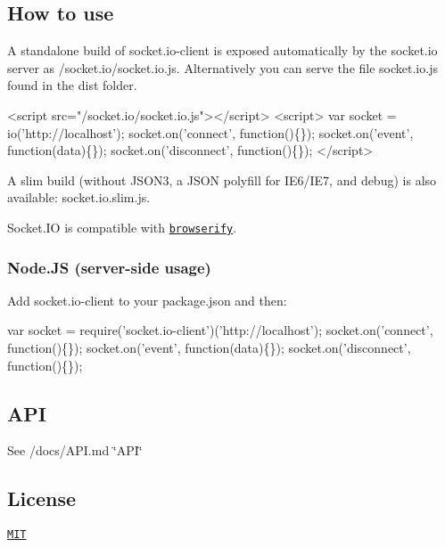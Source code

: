 \href{http://travis-ci.org/socketio/socket.io-client}{\tt } \href{https://david-dm.org/socketio/socket.io-client}{\tt } \href{https://david-dm.org/socketio/socket.io-client#info=devDependencies}{\tt }   \href{http://slack.socket.io}{\tt }

\href{https://saucelabs.com/u/socket}{\tt }

\subsection*{How to use}

A standalone build of {\ttfamily socket.\+io-\/client} is exposed automatically by the socket.\+io server as {\ttfamily /socket.io/socket.\+io.\+js}. Alternatively you can serve the file {\ttfamily socket.\+io.\+js} found in the {\ttfamily dist} folder.


\begin{DoxyCode}
<script src="/socket.io/socket.io.js"></script>
<script>
  var socket = io('http://localhost');
  socket.on('connect', function()\{\});
  socket.on('event', function(data)\{\});
  socket.on('disconnect', function()\{\});
</script>
\end{DoxyCode}


A slim build (without {\ttfamily J\+S\+O\+N3}, a J\+S\+ON polyfill for I\+E6/\+I\+E7, and {\ttfamily debug}) is also available\+: {\ttfamily socket.\+io.\+slim.\+js}.

Socket.\+IO is compatible with \href{http://browserify.org/}{\tt browserify}.

\subsubsection*{Node.\+JS (server-\/side usage)}

Add {\ttfamily socket.\+io-\/client} to your {\ttfamily package.\+json} and then\+:


\begin{DoxyCode}
var socket = require('socket.io-client')('http://localhost');
socket.on('connect', function()\{\});
socket.on('event', function(data)\{\});
socket.on('disconnect', function()\{\});
\end{DoxyCode}


\subsection*{A\+PI}

See /docs/\+A\+PI.md \char`\"{}\+A\+P\+I\char`\"{}

\subsection*{License}

\href{/LICENSE}{\tt M\+IT} 